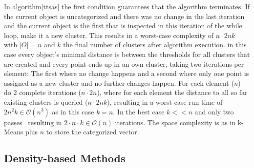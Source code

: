 In algorithm\ref{ttsas} the first condition guarantees that the algorithm terminates. If the current object is uncategorized and there was no change in the last iteration and the current object is the first that is inspected in this iteration of the while loop, make it a new cluster. This results in a worst-case complexity of $n \cdot 2nk$ with $|O| = n$ and $k$ the final number of clusters after algorithm execution. in this case every object's minimal distance is between the thresholds for all clusters that are created and every point ends up in an own cluster, taking two iterations per element: The first where no change happens and a second where only one point is assigned as a new cluster and no further changes happen. For each element ($n$) do 2 complete iterations ($n \cdot 2n$), where for each element the distance to all so far existing clusters is queried ($n \cdot 2nk$), resulting in a worst-case run time of $2n^2k \in \mathcal{O}(n^3)$ as in this case $k = n$. In the best case $k << n$ and only two passes~\cite{THEODORIDIS2009627} resulting in $2 \cdot n \cdot k \in \mathcal{O}(n)$ iterations. The space complexity is as in k-Means plus $n$ to store the categorized vector.

\subsection{Density-based Methods}
